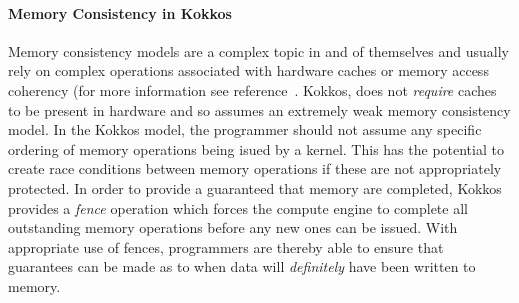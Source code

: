 \paragraph{Memory Consistency in Kokkos}

Memory consistency models are a complex topic in and of themselves
and usually rely on complex operations associated with hardware
caches or memory access coherency (for more information 
see reference~\cite{handp_hardware}. 
Kokkos, does not {\em require} caches to be present
in hardware and so assumes an extremely weak memory consistency
model. In the Kokkos model, the programmer should not assume any
specific ordering of memory operations being isued by a
kernel. This has the potential to create race conditions between
memory operations if these are not appropriately protected. In
order to provide a guaranteed that memory are completed, Kokkos
provides a {\em fence} operation which forces the compute 
engine to complete all outstanding memory operations before
any new ones can be issued. With appropriate use of fences,
programmers are thereby able to ensure that guarantees can
be made as to when data will {\em definitely} have been 
written to memory.

